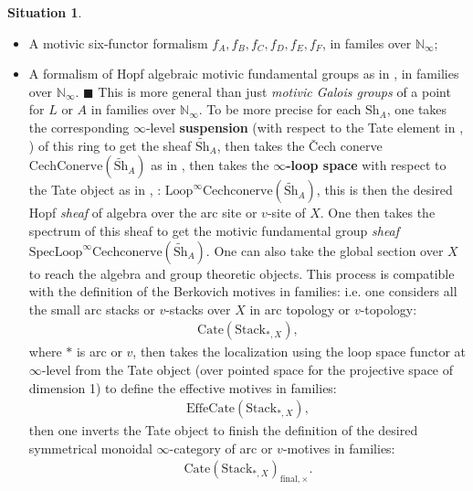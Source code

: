 \documentclass[12pt]{article}
\theoremstyle{definition}
\newtheorem{situation}{Situation}
\begin{document}
\begin{situation}
\begin{itemize}
\item[A4] A motivic six-functor formalism $f_A,f_B,f_C,f_D,f_E,f_F$, in familes over $\mathbb{N}_\infty$;
\item[A5] A formalism of Hopf algebraic motivic fundamental groups as in \cite[4.7]{3A}, in families over $\mathbb{N}_\infty$.
\subitem $\blacksquare$ This is more general than just \textit{motivic Galois groups} of a point for $L$ or $A$ in families over $\mathbb{N}_\infty$. To be more precise for each $\mathrm{Sh}_A$, one takes the corresponding $\infty$-level \textbf{suspension} (with respect to the Tate element in \cite{3A}, \cite{3S}) of this ring to get the sheaf $\widetilde{\mathrm{Sh}}_A$, then takes the \v{C}ech conerve $\mathrm{CechConerve}(\widetilde{\mathrm{Sh}}_A)$ as in \cite[4.9]{3A}, then takes the \textbf{$\infty$-loop space} with respect to the Tate object as in \cite{3A}, \cite{3S}: $\mathrm{Loop}^\infty\mathrm{Cechconerve}(\widetilde{\mathrm{Sh}}_A)$, this is then the desired Hopf \textit{sheaf} of algebra over the arc site or $v$-site of $X$. One then takes the spectrum of this sheaf to get the motivic fundamental group \textit{sheaf} $\mathrm{Spec}\mathrm{Loop}^\infty\mathrm{Cechconerve}(\widetilde{\mathrm{Sh}}_A)$. One can also take the global section over $X$ to reach the algebra and group theoretic objects. This process is compatible with the definition of the Berkovich motives in families: i.e. one considers all the small arc stacks or $v$-stacks over $X$ in arc topology or $v$-topology:
\begin{align}
\mathrm{Cate}(\mathrm{Stack}_{\mathrm{*},X}),
\end{align}
where $*$ is arc or $v$, then takes the localization using the loop space functor at $\infty$-level from the Tate object (over pointed space for the projective space of dimension 1) to define the effective motives in families:
\begin{align}
\mathrm{Effe}\mathrm{Cate}(\mathrm{Stack}_{\mathrm{*},X}),
\end{align}
then one inverts the Tate object to finish the definition of the desired symmetrical monoidal $\infty$-category of arc or $v$-motives in families:
\begin{align}
\mathrm{Cate}(\mathrm{Stack}_{\mathrm{*},X})_{\mathrm{final},\times}.
\end{align}
\end{itemize}

\end{situation}
\end{document}
